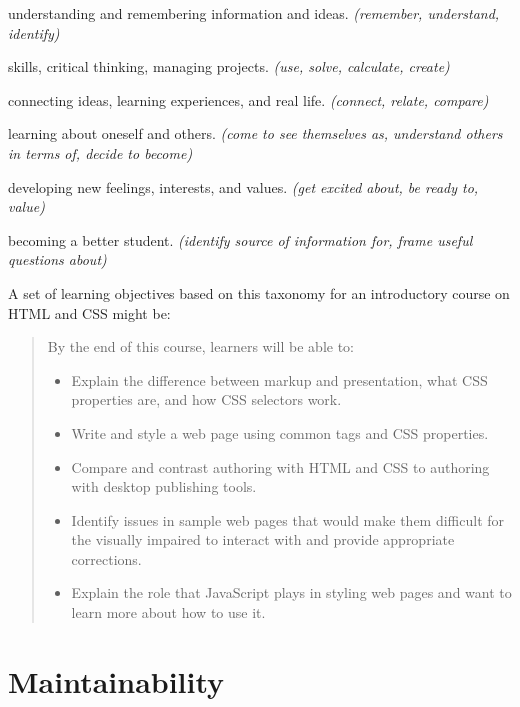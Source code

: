 \begin{description}
\tightlist
\item[Foundational Knowledge:]
understanding and remembering information and ideas. \emph{(remember,
understand, identify)}
\item[Application:]
skills, critical thinking, managing projects. \emph{(use, solve,
calculate, create)}
\item[Integration:]
connecting ideas, learning experiences, and real life. \emph{(connect,
relate, compare)}
\item[Human Dimension:]
learning about oneself and others. \emph{(come to see themselves as,
understand others in terms of, decide to become)}
\item[Caring:]
developing new feelings, interests, and values. \emph{(get excited about,
be ready to, value)}
\item[Learning How to Learn:]
becoming a better student. \emph{(identify source of information for,
frame useful questions about)}
\end{description}

A set of learning objectives based on this taxonomy for an
introductory course on HTML and CSS might be:

\begin{quote}\setlength{\parindent}{0pt}
By the end of this course, learners will be able to:

\begin{itemize}
\item
  Explain the difference between markup and presentation, what CSS
  properties are, and how CSS selectors work.
\item
  Write and style a web page using common tags and CSS properties.
\item
  Compare and contrast authoring with HTML and CSS to authoring with
  desktop publishing tools.
\item
  Identify issues in sample web pages that would make them difficult
  for the visually impaired to interact with and provide appropriate
  corrections.
\item
  Explain the role that JavaScript plays in styling web pages and
  want to learn more about how to use it.
\end{itemize}
\end{quote}

\section{Maintainability}\label{s:process-maintainability}


